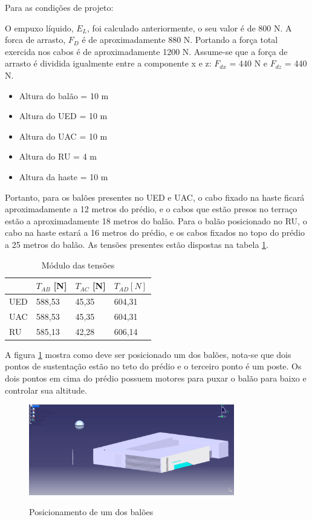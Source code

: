 	Para as condições de projeto:

	O empuxo líquido, $E_{L}$, foi calculado anteriormente, o seu valor é de 800 N. A forca de arrasto, $F_{D}$ é de aproximadamente 880 N. Portando a força total exercida nos cabos é de aproximadamente 1200 N. Assume-se que a força de arrasto é dividida igualmente entre a componente x e z: $F_{dx}$ = 440 N e $F_{dz}$ = 440 N.

	\begin{itemize}
		\item Altura do balão = 10 m
 		\item Altura do UED = 10 m
 		\item Altura do UAC = 10 m
 		\item Altura do RU = 4 m
 		\item Altura da haste = 10 m
	\end{itemize}

Portanto, para os balões presentes no UED e UAC, o cabo fixado na haste ficará aproximadamente a 12 metros do prédio, e o cabos que estão presos no terraço estão a aproximadamente 18 metros do balão. Para o balão posicionado no RU, o cabo na haste estará a 16 metros do prédio, e os cabos fixados no topo do prédio a 25 metros do balão. As tensões presentes estão dispostas na tabela \ref{table:modTensoes}.

\begin{table}[htp]
\centering
\caption{ Módulo das tensões}
\begin{tabular}{l|l|l|l|}
\cline{2-4}
 & $T_{AB}$ [N] & $T_{AC}$ [N] & $T_{AD} [N]$ \\ \hline
\multicolumn{1}{|l|}{UED} & 588,53 & 45,35 & 604,31 \\ \hline
\multicolumn{1}{|l|}{UAC} & 588,53 & 45,35 & 604,31 \\ \hline
\multicolumn{1}{|l|}{RU} & 585,13 & 42,28 & 606,14 \\ \hline
\end{tabular}
\label{table:modTensoes}
\end{table}

A figura \ref{img:pos-bal} mostra como deve ser posicionado um dos balões, nota-se que dois pontos de sustentação estão no teto do prédio e o terceiro ponto é um poste. Os dois pontos em cima do prédio possuem motores para puxar o balão para baixo e controlar sua altitude.

\begin{figure}[htp]
	\centering
	\caption{Posicionamento de um dos balões}
	\includegraphics[width=0.8\textwidth]{figuras/pos-bal}
	\label{img:pos-bal}
\end{figure}

